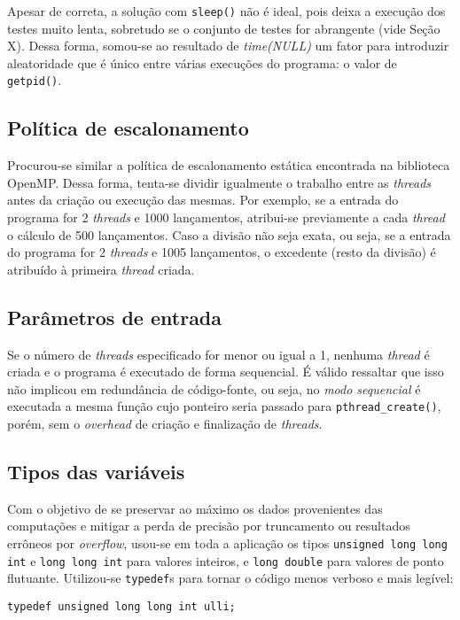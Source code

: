 \documentclass[12pt,a4paper]{article}
\begin{document}
Apesar de correta, a solução com \texttt{sleep()} não é ideal, pois deixa a
execução dos testes muito lenta, sobretudo se o conjunto de testes for
abrangente (vide Seção X). Dessa forma, somou-se ao resultado de
\textit{time(NULL)} um fator para introduzir aleatoridade que é único entre
várias execuções do programa: o valor de \texttt{getpid()}.

\subsection{Política de escalonamento}
Procurou-se similar a política de escalonamento estática encontrada na
biblioteca OpenMP.  Dessa forma, tenta-se dividir igualmente o trabalho entre
as \textit{threads} antes da criação ou execução das mesmas. Por exemplo, se a
entrada do programa for 2 \textit{threads} e 1000 lançamentos, atribui-se
previamente a cada \textit{thread} o cálculo de 500 lançamentos. Caso a divisão
não seja exata, ou seja, se a entrada do programa for 2 \textit{threads} e 1005
lançamentos, o excedente (resto da divisão) é atribuído à primeira
\textit{thread} criada.


\subsection{Parâmetros de entrada}
Se o número de \textit{threads} especificado for menor ou igual a 1, nenhuma
\textit{thread} é criada e o programa é executado de forma sequencial. É válido
ressaltar que isso não implicou em redundância de código-fonte, ou seja, no
\emph{modo sequencial} é executada a mesma função cujo ponteiro seria passado
para \texttt{pthread\_create()}, porém, sem o \textit{overhead} de criação e
finalização de \textit{threads}.


\subsection{Tipos das variáveis}
Com o objetivo de se preservar ao máximo os dados provenientes das computações
e mitigar a perda de precisão por truncamento ou resultados errôneos por
\textit{overflow}, usou-se em toda a aplicação os tipos \texttt{unsigned long
long int} e \texttt{long long int} para valores inteiros, e \texttt{long
double} para valores de ponto flutuante. Utilizou-se \texttt{typedef}s para tornar o código menos verboso e mais 
legível:

\begin{verbatim}
typedef unsigned long long int ulli;
\end{verbatim}
\end{document}

